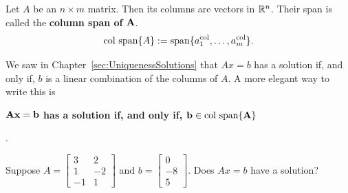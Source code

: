 




\begin{tcolorbox}[sharp corners, colback=green!30, colframe=green!80!blue, title=\textbf{\Large Column Span of a Matrix}]
Let $A$ be an $n \times m$ matrix. Then its columns are vectors in $\mathbb R^n$. Their span is called the \textbf{column span of} ${\bf A}$.
$$\mathrm{col~span} \{ A \}:=\mathrm{span} \{ a^{\rm col}_1, \ldots, a^{\rm col}_m  \}. $$

We saw in Chapter~\ref{sec:UniquenessSolutions} that $Ax=b$ has a solution if, and only if, $b$ is a linear combination of the columns of $A$. A more elegant way to write this is\newline
\centerline{\bf ${\bf Ax=b}$ has a solution if, and only if, ${\bf b \in \mathrm{col~span} \{ A \}}$}. 
\end{tcolorbox}

\vspace*{.2cm}
\begin{example}
\label{ex:ColSpan01} Suppose $A=\left[\begin{array}{rrr}  3 & 2\\ 1 & -2 \\ -1 & 1 \end{array} \right]$ and $b=\left[\begin{array}{r} 0 \\ -8 \\ 5 \end{array} \right]$. Does $Ax=b$ have a solution? 
 \end{example}

